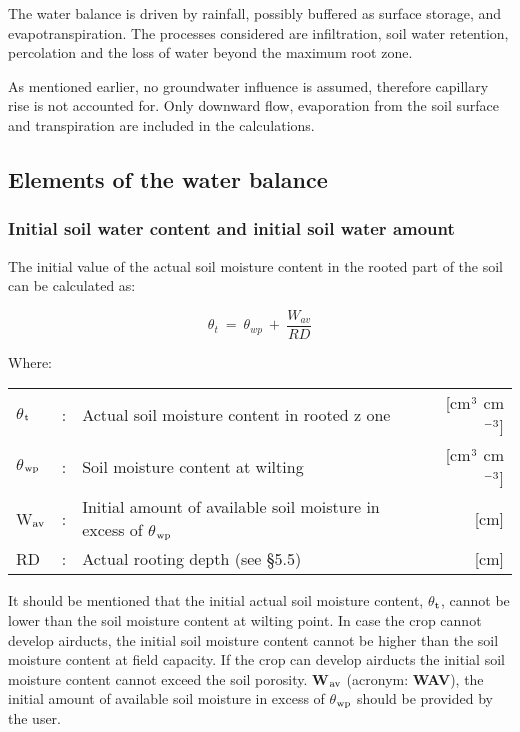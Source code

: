 The water balance is driven by rainfall, possibly buffered as surface storage, and
evapotranspi\-ration. The processes considered are infiltration, soil water retention,
percolation and the loss of water beyond the maximum root zone.

As mentioned earlier, no groundwater influence is assumed, therefore capillary rise is not
accounted for. Only downward flow, evaporation from the soil surface and transpiration
are included in the calcula\-tions. 

\subsection{Elements of the water balance  }


\subsubsection{Initial soil water content and initial soil water amount}

The initial value of the actual soil moisture content in the rooted part of the soil can be
calculated as:

\begin{equation}
\theta_{t} ~ =~\theta_{wp} ~+~{\frac{W_{av}}{RD}}
\end{equation}

Where:\\
\begin{tabularx}{\textwidth}{llXr}
$\theta$$_{{\rm t}}$ &:& Actual soil moisture content in rooted z
    one  & [cm$^{{\rm 3}}$ cm$^{{\rm -3}}$]\\
$\theta$$_{{\rm wp}}$ &:& Soil moisture content at wilting   & [cm$^{{\rm 3}}$ cm$^{{\rm -3}}$]\\
W$_{{\rm av}}$ &:& Initial amount of available soil moisture 
    in excess of $\theta$$_{{\rm wp}}$ & [cm]\\
RD &:& Actual rooting depth (see \S 5.5) & [cm]\\
\end{tabularx}

It should be mentioned that the initial actual soil moisture content, $\theta$$_{{\rm t}}$, cannot be lower
than the soil moisture content at wilting point. In case the crop cannot develop airducts,
the initial soil moisture content cannot be higher than the soil moisture content at field
capacity. If the crop can develop airducts the initial soil moisture content cannot exceed
the soil porosity. {\bf W$_{{\rm av}}$} (acronym: {\bf WAV}), the initial amount of available soil moisture in
excess of $\theta$$_{{\rm wp}}$ should be provided by the user. 

